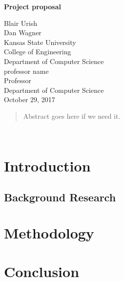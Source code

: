 \documentclass[letterpaper, 12pt]{article}
\begin{document}
\begin{titlepage}
\centering
	\vspace*{5.75cm}
	{\huge\bfseries Project proposal\par}
	\vspace{2cm}
	Blair Urish\\
	Dan Wagner\\
	Kansas State University\\
	College of Engineering\\
	Department of Computer Science\\
	\vspace{1cm}
	professor name\\
	Professor\\
	Department of Computer Science\\
	\vspace{1cm}
	October 29, 2017
\end{titlepage}

\begin{abstract}
\thispagestyle{plain}
\begin{flushleft}
	Abstract goes here if we need it.
\end{flushleft}
\end{abstract}
~\newpage

\begin{flushleft}

\section*{Introduction}
\subsection*{Background Research}


\section*{Methodology}

\section*{Conclusion}

\newpage
\printbibliography

\end{flushleft}
\end{document}
